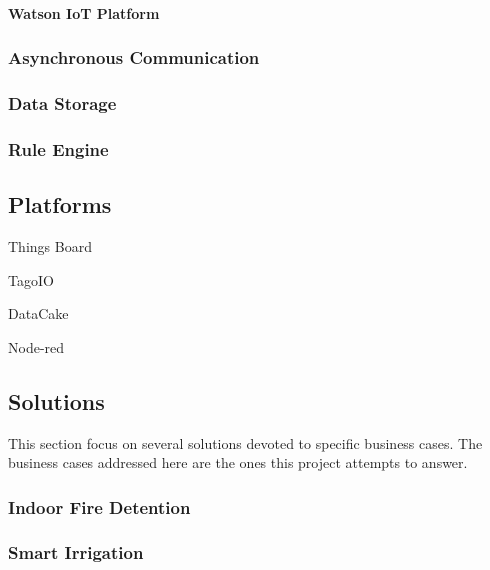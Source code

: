 \paragraph{Watson IoT Platform}
\label{par:stateofart:arch:infra:middleware:watson}

\subsubsection{Asynchronous Communication}
\label{subsubsec:stateofart:arch:infra:async}

\subsubsection{Data Storage}
\label{subsubsec:stateofart:arch:infra:store}

\subsubsection{Rule Engine}
\label{subsubsec:stateofart:arch:infra:rule}

\subsection{Platforms}
\label{subsec:stateofart:arch:platforms}

Things Board

TagoIO

DataCake

Node-red

\subsection{Solutions}
\label{subsec:stateofart:arch:solutions}

This section focus on several solutions devoted to specific business cases. 
The business cases addressed here are the ones this project attempts to answer.

\subsubsection{Indoor Fire Detention}
\label{subsubsec:stateofart:arch:solutions:fire}

\subsubsection{Smart Irrigation}
\label{subsubsec:stateofart:arch:solutions:irrigation}

